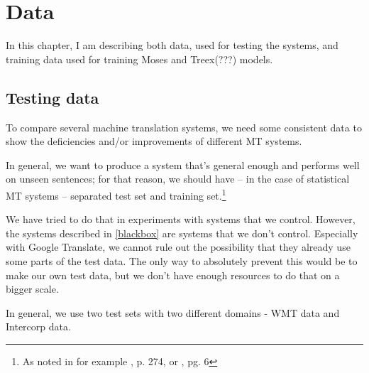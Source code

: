 \chapter{Data}
In this chapter, I am describing both data, used for testing the systems, and training data used for training Moses and Treex(???) models.

\section{Testing data}
To compare several machine translation systems, we need some consistent data to show the deficiencies and/or improvements of different MT systems.

In general, we want to produce a system that's general enough and performs well on unseen sentences; for that reason, we should have -- in the case of statistical MT systems -- separated test set and training set.\footnote{As noted in for example \cite{koehn2010statistical}, p. 274, or \cite{bishop}, pg. 6}

We have tried to do that in experiments with systems that we control. However, the systems described in \ref{blackbox} are systems that we don't control. Especially with Google Translate, we cannot rule out the possibility that they already use some parts of the test data. The only way to absolutely prevent this would be to make our own test data, but we don't have enough resources to do that on a bigger scale.

In general, we use two test sets with two different domains - WMT data and Intercorp data.


